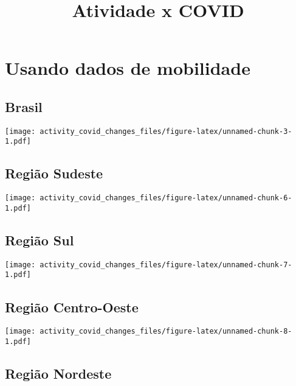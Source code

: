 \documentclass[
]{article}
\title{Atividade x COVID}
\author{}
\date{\vspace{-2.5em}}
\begin{document}
\maketitle

\hypertarget{usando-dados-de-mobilidade}{%
\section{Usando dados de mobilidade}\label{usando-dados-de-mobilidade}}

\hypertarget{brasil}{%
\subsection{Brasil}\label{brasil}}

\texttt{[image: activity\_covid\_changes\_files/figure-latex/unnamed-chunk-3-1.pdf]}

\pagebreak

\hypertarget{regiuxe3o-sudeste}{%
\subsection{Região Sudeste}\label{regiuxe3o-sudeste}}

\texttt{[image: activity\_covid\_changes\_files/figure-latex/unnamed-chunk-6-1.pdf]}

\pagebreak

\hypertarget{regiuxe3o-sul}{%
\subsection{Região Sul}\label{regiuxe3o-sul}}

\texttt{[image: activity\_covid\_changes\_files/figure-latex/unnamed-chunk-7-1.pdf]}

\pagebreak

\hypertarget{regiuxe3o-centro-oeste}{%
\subsection{Região Centro-Oeste}\label{regiuxe3o-centro-oeste}}

\texttt{[image: activity\_covid\_changes\_files/figure-latex/unnamed-chunk-8-1.pdf]}

\pagebreak

\hypertarget{regiuxe3o-nordeste}{%
\subsection{Região Nordeste}\label{regiuxe3o-nordeste}}
\end{document}
